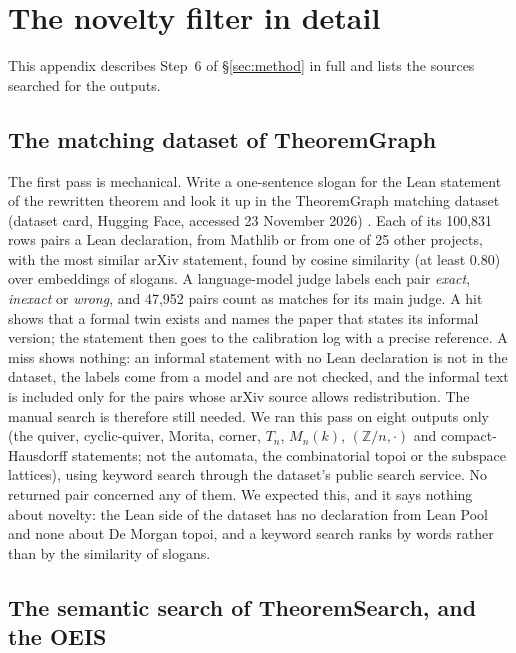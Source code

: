\section{The novelty filter in detail}\label{app:novelty}

This appendix describes Step~6 of \S\ref{sec:method} in full and lists the sources searched for the outputs.

\subsection{The matching dataset of TheoremGraph}

The first pass is mechanical. Write a one-sentence slogan for the Lean statement of the rewritten theorem and look it up in the TheoremGraph matching dataset (dataset card, Hugging Face, accessed 23 November 2026) \cite{theoremgraph-matching}. Each of its 100,831 rows pairs a Lean declaration, from Mathlib or from one of 25 other projects, with the most similar arXiv statement, found by cosine similarity (at least 0.80) over embeddings of slogans. A language-model judge labels each pair \emph{exact}, \emph{inexact} or \emph{wrong}, and 47,952 pairs count as matches for its main judge. A hit shows that a formal twin exists and names the paper that states its informal version; the statement then goes to the calibration log with a precise reference. A miss shows nothing: an informal statement with no Lean declaration is not in the dataset, the labels come from a model and are not checked, and the informal text is included only for the pairs whose arXiv source allows redistribution. The manual search is therefore still needed. We ran this pass on eight outputs only (the quiver, cyclic-quiver, Morita, corner, $T_n$, $M_n(k)$, $(\mathbb Z/n,\cdot)$ and compact-Hausdorff statements; not the automata, the combinatorial topoi or the subspace lattices), using keyword search through the dataset's public search service. No returned pair concerned any of them. We expected this, and it says nothing about novelty: the Lean side of the dataset has no declaration from Lean Pool and none about De Morgan topoi, and a keyword search ranks by words rather than by the similarity of slogans.

\subsection{The semantic search of TheoremSearch, and the OEIS}

